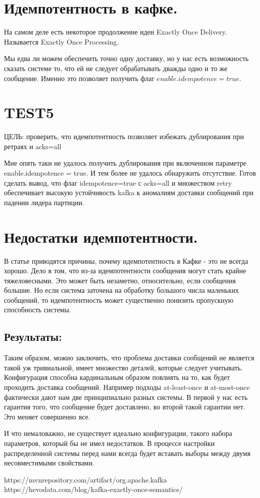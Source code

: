 \documentclass[11pt]{article}
\begin{document}
    \section{Идемпотентность в кафке.}
    На самом деле есть некоторое продолжение идеи Exactly Once Delivery. Называется Exactly Once Processing.

    Мы едва ли можем обеспечить точно одну доставку, но у нас есть возможность сказать системе то, что ей не следует обрабатывать дважды одно и то же сообщение. Именно это позволяет получить флаг $enable.idempotence = true$.
    
    \section{TEST5}
    ЦЕЛЬ: проверить, что идемпотентность позволяет избежать дублирования при ретраях и acks=all

    Мне опять таки не удалось получить дублирования при включенном параметре enable.idempotence = true. И тем более не удалось обнаружить отсутствие. Готов сделать вывод, что флаг idempotence=true с acks=all и множеством retry обеспечивает высокую устойчивость kafka к аномалиям доставки сообщений при падении лидера партиции.
    \section{Недостатки идемпотентности.}
    В статье \cite{k2} приводятся причины, почему идемпотентность в Кафке - это не всегда хорошо. Дело в том, что
    из-за идемпотентности сообщения могут стать крайне тяжеловесными. Это может быть незаметно, относительно, если
    сообщения большие. Но если система заточена на обработку большого числа маленьких сообщений, то идемпотентность
    может существенно понизить пропускную способность системы.
    \subsection{Результаты:}
    Таким образом, можно заключить, что проблема доставки сообщений не является такой уж тривиальной, имеет множество
    деталей, которые следует учитывать. Конфигурация способна кардинальным образом повлиять на то, как будет
    проходить доставка сообщений. Например подходы at-least-once и at-most-once фактически дают нам две принципиально
    разных системы. В первой у нас есть гарантия того, что сообщение будет доставлено, во второй такой гарантии нет.
    Это меняет совершенно все.

    И что немаловажно, не существует идеально конфигурации, такого набора параметров, который бы не имел недостатков.
    В процессе настройки распределенной системы перед нами всегда будет вставать выборы между двумя несовместимыми
    свойствами.
    \begin{thebibliography}
         https://mvnrepository.com/artifact/org.apache.kafka
         https://hevodata.com/blog/kafka-exactly-once-semantics/
    \end{thebibliography}
\end{document}
